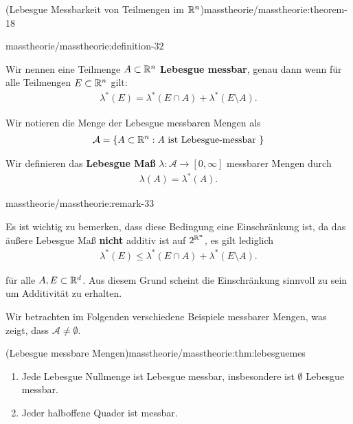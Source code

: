 \begin{theorem}{(Lebesgue Messbarkeit von Teilmengen im \protect\(\mathbb{R}^n\protect\))}{masstheorie/masstheorie:theorem-18}
\begin{definition}{}{masstheorie/masstheorie:definition-32}
\par
Wir nennen eine Teilmenge \(A \subset \mathbb{R}^n\) \textbf{Lebesgue messbar}, genau dann wenn für alle Teilmengen \(E \subset \mathbb{R}^n\) gilt:
\begin{align*}
\lambda^*(E) = \lambda^*(E \cap A) + \lambda^*(E \setminus A).
\end{align*}
\par
Wir notieren die Menge der Lebesgue messbaren Mengen als
\begin{align*}
\mathcal{A} = \lbrace A \subset \mathbb{R}^n : A \text{ ist Lebesgue-messbar } \rbrace
\end{align*}
\par
Wir definieren das \textbf{Lebesgue Maß} \(\lambda \colon \mathcal{A} \rightarrow [0,\infty]\) messbarer Mengen durch
\begin{align*}
\lambda(A) = \lambda^*(A).
\end{align*}\end{definition}
\begin{remark}{}{masstheorie/masstheorie:remark-33}



\par
Es ist wichtig zu bemerken, dass diese Bedingung eine Einschränkung ist, da das äußere Lebesgue Maß \textbf{nicht} additiv ist auf \(2^{\mathbb{R}^n}\), es gilt lediglich
\begin{align*}
\lambda^*(E) \leq \lambda^*(E \cap A) + \lambda^*(E \setminus A).
\end{align*}
\par
für alle \(A,E\subset\mathbb{R}^d\). Aus diesem Grund scheint die Einschränkung sinnvoll zu sein um Additivität zu erhalten.
\end{remark}

\par
Wir betrachten im Folgenden verschiedene Beispiele messbarer Mengen, was zeigt, dass \(\mathcal{A}\neq \emptyset\).
\begin{lemma}{(Lebesgue messbare Mengen)}{masstheorie/masstheorie:thm:lebesguemes}


\begin{enumerate}

\item {} 
\par
Jede Lebesgue Nullmenge ist Lebesgue messbar, insbesondere ist \(\emptyset\) Lebesgue messbar.

\item {} 
\par
Jeder halboffene Quader ist messbar.


\end{enumerate}
\end{lemma}
\end{theorem}
